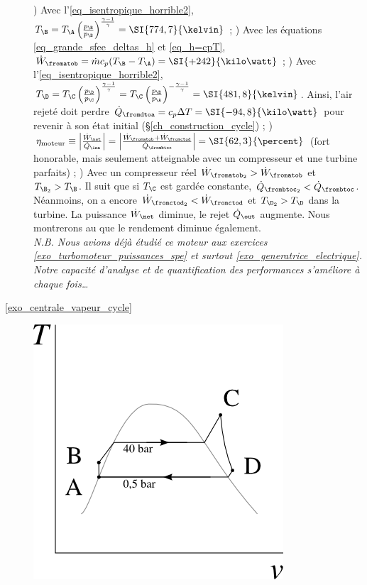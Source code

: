 \begin{description}
			) Avec l’\cref{eq_isentropique_horrible2}, $T_\B = T_\A \left(\frac{p_\B}{p_\B}\right)^{\frac{\gamma - 1}{\gamma}} = \SI{774,7}{\kelvin}$ ;
			) Avec les équations \ref{eq_grande_sfee_deltas_h} et \ref{eq_h=cpT}, $\dot W_\fromatob = \dot m c_p (T_\B - T_\A) = \SI{+242}{\kilo\watt}$  ;
			) Avec l’\cref{eq_isentropique_horrible2}, $T_\D = T_\C \left(\frac{p_\D}{p_\C}\right)^{\frac{\gamma - 1}{\gamma}} = T_\C \left(\frac{p_\B}{p_\A}\right)^{-\frac{\gamma - 1}{\gamma}} = \SI{481,8}{\kelvin}$. Ainsi, l’air rejeté doit perdre $\dot Q_\fromdtoa = c_p \Delta T = \SI{-94,8}{\kilo\watt}$ pour revenir à son état initial (\S\ref{ch_construction_cycle}) ;
			) $\eta_\text{moteur} \equiv \left|\frac{\dot W_\net}{\dot Q_\inn} \right| = \left|\frac{\dot W_\fromatob + \dot W_\fromctod}{\dot Q_\frombtoc} \right| = \SI{62,3}{\percent} $ (fort honorable, mais seulement atteignable avec un compresseur et une turbine parfaits) ;
			) Avec un compresseur réel $\dot W_{\fromatob_2} > \dot W_\fromatob$ et $T_{\B_2} > T_\B$.
						Il suit que si $T_\C$ est gardée constante, $\dot Q_{\frombtoc_2} < \dot Q_\frombtoc$.
						Néanmoins, on a encore $\dot W_{\fromctod_2} < \dot W_\fromctod$ et $T_{\D_2} > T_\D$ dans la turbine. La puissance $\dot W_\net$ diminue, le rejet $\dot Q_\out$ augmente. Nous montrerons au \courssept que le rendement diminue également.\\
					\textit{N.B. Nous avions déjà étudié ce moteur aux exercices \ref{exo_turbomoteur_puissances_spe} et surtout \ref{exo_generatrice_electrique}. Notre capacité d’analyse et de quantification des performances s’améliore à chaque fois…}		
	\item [\ref{exo_centrale_vapeur_cycle}] 
			\includegraphics[height=\solutiondiagramwidth]{images/exo_sol_tv_moteur_vapeur.png}

\end{description}
